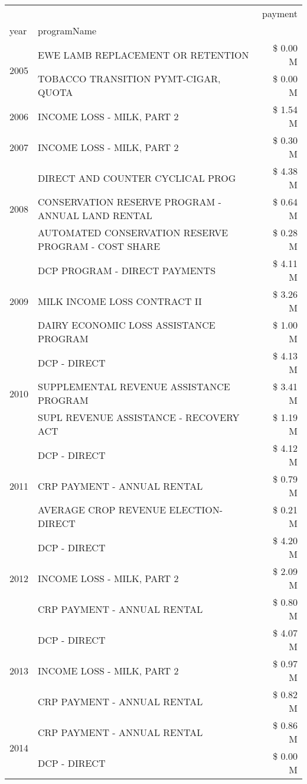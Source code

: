 \begin{tabular}{llr}
\toprule
 &  & payment \\
year & programName &  \\
\midrule
\multirow[t]{2}{*}{2005} & EWE LAMB REPLACEMENT OR RETENTION & \$ 0.00 M \\
 & TOBACCO TRANSITION PYMT-CIGAR, QUOTA & \$ 0.00 M \\
\cline{1-3}
2006 & INCOME LOSS - MILK, PART 2 & \$ 1.54 M \\
\cline{1-3}
2007 & INCOME LOSS - MILK, PART 2 & \$ 0.30 M \\
\cline{1-3}
\multirow[t]{3}{*}{2008} & DIRECT AND COUNTER CYCLICAL PROG & \$ 4.38 M \\
 & CONSERVATION RESERVE PROGRAM - ANNUAL LAND RENTAL & \$ 0.64 M \\
 & AUTOMATED CONSERVATION RESERVE PROGRAM - COST SHARE & \$ 0.28 M \\
\cline{1-3}
\multirow[t]{3}{*}{2009} & DCP PROGRAM - DIRECT PAYMENTS & \$ 4.11 M \\
 & MILK INCOME LOSS CONTRACT II & \$ 3.26 M \\
 & DAIRY ECONOMIC LOSS ASSISTANCE PROGRAM & \$ 1.00 M \\
\cline{1-3}
\multirow[t]{3}{*}{2010} & DCP - DIRECT & \$ 4.13 M \\
 & SUPPLEMENTAL REVENUE ASSISTANCE PROGRAM & \$ 3.41 M \\
 & SUPL REVENUE ASSISTANCE - RECOVERY ACT & \$ 1.19 M \\
\cline{1-3}
\multirow[t]{3}{*}{2011} & DCP - DIRECT & \$ 4.12 M \\
 & CRP PAYMENT - ANNUAL RENTAL & \$ 0.79 M \\
 & AVERAGE CROP REVENUE ELECTION-DIRECT & \$ 0.21 M \\
\cline{1-3}
\multirow[t]{3}{*}{2012} & DCP - DIRECT & \$ 4.20 M \\
 & INCOME LOSS - MILK, PART 2 & \$ 2.09 M \\
 & CRP PAYMENT - ANNUAL RENTAL & \$ 0.80 M \\
\cline{1-3}
\multirow[t]{3}{*}{2013} & DCP - DIRECT & \$ 4.07 M \\
 & INCOME LOSS - MILK, PART 2 & \$ 0.97 M \\
 & CRP PAYMENT - ANNUAL RENTAL & \$ 0.82 M \\
\cline{1-3}
\multirow[t]{2}{*}{2014} & CRP PAYMENT - ANNUAL RENTAL & \$ 0.86 M \\
 & DCP - DIRECT & \$ 0.00 M \\

\end{tabular}
